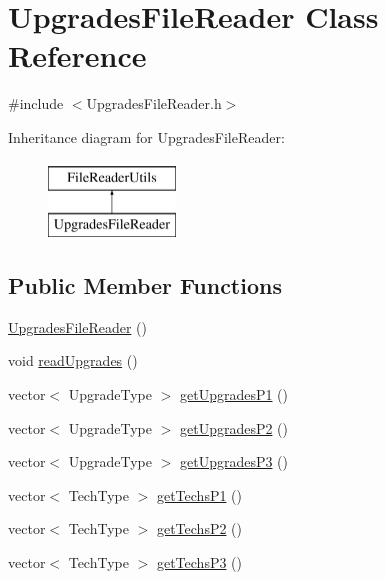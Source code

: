 \hypertarget{class_upgrades_file_reader}{
\section{UpgradesFileReader Class Reference}
\label{class_upgrades_file_reader}
}


{\ttfamily \#include $<$UpgradesFileReader.h$>$}

Inheritance diagram for UpgradesFileReader:\begin{figure}[H]
\begin{center}
\leavevmode
\includegraphics[height=2.000000cm]{class_upgrades_file_reader}
\end{center}
\end{figure}
\subsection*{Public Member Functions}
\begin{DoxyCompactItemize}
\item 
\hyperlink{class_upgrades_file_reader_a9abf381159a844b23737250ac383b5ff}{UpgradesFileReader} ()
\item 
void \hyperlink{class_upgrades_file_reader_ab19b0615e6a28e701b44b124eee88660}{readUpgrades} ()
\item 
vector$<$ UpgradeType $>$ \hyperlink{class_upgrades_file_reader_a5e8f5eb70a48fed09f3a8bd029095ef2}{getUpgradesP1} ()
\item 
vector$<$ UpgradeType $>$ \hyperlink{class_upgrades_file_reader_a73ba9e1b8e0c5d3acb94ab42e7190213}{getUpgradesP2} ()
\item 
vector$<$ UpgradeType $>$ \hyperlink{class_upgrades_file_reader_a59b31aecb65df70b2d4707d539aed141}{getUpgradesP3} ()
\item 
vector$<$ TechType $>$ \hyperlink{class_upgrades_file_reader_ae8cb69d0a4d47064e934aed916cce86c}{getTechsP1} ()
\item 
vector$<$ TechType $>$ \hyperlink{class_upgrades_file_reader_a22e604fe0919728641eb3220352e7651}{getTechsP2} ()
\item 
vector$<$ TechType $>$ \hyperlink{class_upgrades_file_reader_aa4d4ec980cf3398c771d58e25499c3ea}{getTechsP3} ()
\end{DoxyCompactItemize}


